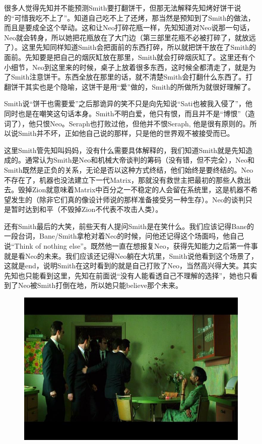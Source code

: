 \documentclass[UTF8]{ctexart}
\begin{document}
很多人觉得先知并不能预测Smith要打翻饼干，但那无法解释先知烤好饼干说的“可惜我吃不上了”。知道自己吃不上了还烤，那当然是预知到了Smith的做法，而且是要成全这个举动。这和让Neo打碎花瓶一样，先知知道对Neo说那一句话，Neo就会转身，所以她把花瓶放在了大门边（第三部里花瓶不必被打碎了，就放远了）。这里先知同样知道Smith会把面前的东西打碎，所以就把饼干放在了Smith的面前。先知要是把自己的烟灰缸放在那里，Smith就会打碎烟灰缸了。这里还有个小细节，Neo到这里来的时候，桌子上放着很多东西，这时候全都清走了，就是为了Smith注意饼干。东西全放在那里的话，就不清楚Smith会打翻什么东西了。打翻饼干其实也是个隐喻，这饼干是用“爱”做的，Smith的所做所为就很好理解了。

Smith说“饼干也需要爱”之后那诡异的笑不只是向先知说“Sati也被我入侵了”，他同时也是在嘲笑这句话本身。Smith不明白爱，他只有恨，而且并不是“博恨”（造词了），他只恨Neo。Seraph也打败过他，但他并不恨Seraph, 他是很有原则的。所以说Smith并不坏，正如他自己说的那样，只是他的世界观不被接受而已。

这里Smith管先知叫妈妈，没有什么需要具体解释的，我们知道Smith就是先知造成的。通常认为Smith是Neo和机械大帝谈判的筹码（没有错，但不完全），Neo和Smith既然是正负的关系，无论是否以这种方式终结，他们始终是要终结的。Neo不存在了，机器也没法建立下一代Matrix，那就没有救世主把最初的那些人救出去。毁掉Zion就意味着Matrix中百分之一不稳定的人会留在系统里，这是机器不希望发生的（除非它们真的像设计师说的那样准备接受另一种生存）。Neo的谈判只是暂时达到和平（不毁掉Zion不代表不攻击人类）。

还有Smith最后的大笑，前些天有人提问Smith是在笑什么。我们应该记得Bane的一段台词，Bane/Smith拿枪对着Neo的时候，问他还记得这个场面吗，他自己说“Think of nothing else”。既然他一直在想报复Neo，获得先知能力之后第一件事就是看Neo的未来。我们应该还记得Neo躺在大坑里，Smith说他看到这个场景了，这就是end，说明Smith在这时看到的就是自己打败了Neo，当然高兴得大笑。其实先知也只能看到这里，先知在前面说“没有人能看透自己不理解的选择”，她也只看到了Neo被Smith打倒在地，所以她只能believe那个未来。

\begin{figure}[htb]
\centering
\includegraphics[width=0.5\linewidth]{fig/45c00df489aee5ef7609d702.jpg}
\end{figure}
\end{document}

